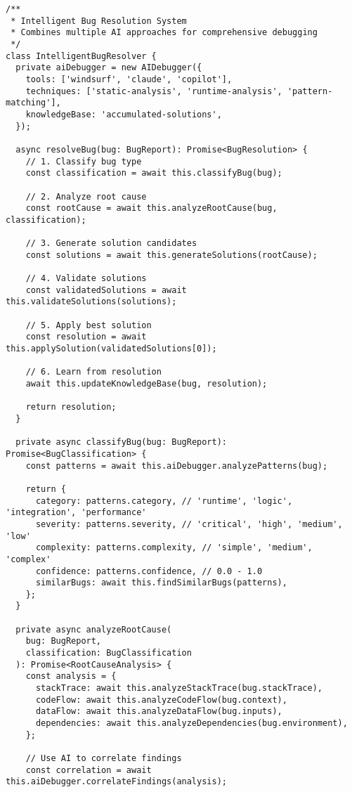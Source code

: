 \documentclass[11pt,a4paper]{article}
\begin{document}
\begin{lstlisting}[style=typescript, caption=AI-Powered Bug Detection System]
/**
 * Intelligent Bug Resolution System
 * Combines multiple AI approaches for comprehensive debugging
 */
class IntelligentBugResolver {
  private aiDebugger = new AIDebugger({
    tools: ['windsurf', 'claude', 'copilot'],
    techniques: ['static-analysis', 'runtime-analysis', 'pattern-matching'],
    knowledgeBase: 'accumulated-solutions',
  });

  async resolveBug(bug: BugReport): Promise<BugResolution> {
    // 1. Classify bug type
    const classification = await this.classifyBug(bug);

    // 2. Analyze root cause
    const rootCause = await this.analyzeRootCause(bug, classification);

    // 3. Generate solution candidates
    const solutions = await this.generateSolutions(rootCause);

    // 4. Validate solutions
    const validatedSolutions = await this.validateSolutions(solutions);

    // 5. Apply best solution
    const resolution = await this.applySolution(validatedSolutions[0]);

    // 6. Learn from resolution
    await this.updateKnowledgeBase(bug, resolution);

    return resolution;
  }

  private async classifyBug(bug: BugReport): Promise<BugClassification> {
    const patterns = await this.aiDebugger.analyzePatterns(bug);
    
    return {
      category: patterns.category, // 'runtime', 'logic', 'integration', 'performance'
      severity: patterns.severity, // 'critical', 'high', 'medium', 'low'
      complexity: patterns.complexity, // 'simple', 'medium', 'complex'
      confidence: patterns.confidence, // 0.0 - 1.0
      similarBugs: await this.findSimilarBugs(patterns),
    };
  }

  private async analyzeRootCause(
    bug: BugReport, 
    classification: BugClassification
  ): Promise<RootCauseAnalysis> {
    const analysis = {
      stackTrace: await this.analyzeStackTrace(bug.stackTrace),
      codeFlow: await this.analyzeCodeFlow(bug.context),
      dataFlow: await this.analyzeDataFlow(bug.inputs),
      dependencies: await this.analyzeDependencies(bug.environment),
    };

    // Use AI to correlate findings
    const correlation = await this.aiDebugger.correlateFindings(analysis);


\end{lstlisting}
\end{document}
